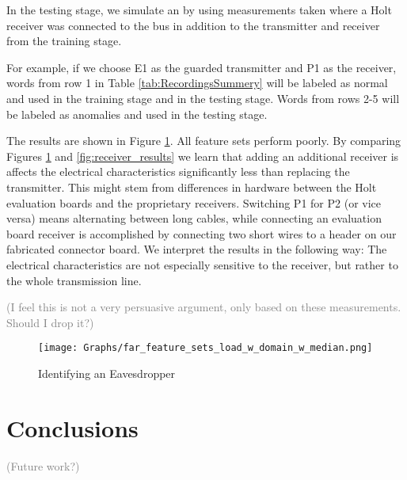 \documentclass[conference]{IEEEtran}
\begin{document}
  In the testing stage, we simulate an by using measurements taken where a Holt receiver was connected to the bus in addition to the transmitter and receiver from the training stage.
  
  For example, if we choose E1 as the guarded transmitter and P1 as the receiver, words from row 1 in Table \ref{tab:RecordingsSummery} will be labeled as normal and used in the training stage and in the testing stage. Words from rows 2-5 will be labeled as anomalies and used in the testing stage.
  
  The results are shown in Figure \ref{fig:load_results}. All feature sets perform poorly. By comparing Figures \ref{fig:load_results} and \ref{fig:receiver_results} we learn that adding an additional receiver is affects the electrical characteristics significantly less than replacing the transmitter. This might stem from differences in hardware between the Holt evaluation boards and the proprietary receivers. Switching P1 for P2 (or vice versa) means alternating between long cables, while connecting an evaluation board receiver is accomplished by connecting two short wires to a header on our fabricated connector board. We interpret the results in the following way:
  The electrical characteristics are not especially sensitive to the receiver, but rather to the whole transmission line.
  
  \textcolor{gray}{(I feel this is not a very persuasive argument, only based on these measurements. Should I drop it?)}
  
  \begin{figure}[t]
    \centering
    \texttt{[image: Graphs/far\_feature\_sets\_load\_w\_domain\_w\_median.png]}
    \caption{Identifying an Eavesdropper}
    \label{fig:load_results}
  \end{figure}

\section{Conclusions}

  \textcolor{gray}{(Future work?)}


 
\end{document}
